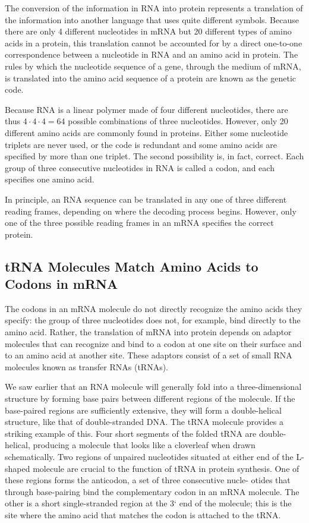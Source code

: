 The conversion of the information in RNA into protein represents a translation
of the information into another language that uses
quite different symbols. Because there are only 4 different nucleotides in
mRNA but 20 different types of amino acids in a protein, this translation
cannot be accounted for by a direct one-to-one correspondence between
a nucleotide in RNA and an amino acid in protein. The rules by which the
nucleotide sequence of a gene, through the medium of mRNA, is translated
into the amino acid sequence of a protein are known as the genetic
code.

Because RNA is a linear polymer made of four different 
nucleotides, there are thus $4 \cdot 4 \cdot 4 = 64$ possible combinations of
three nucleotides. However, only 20 different amino acids are commonly
found in proteins. Either some nucleotide triplets are never used, or
the code is redundant and some amino acids are
specified by more than one triplet. The second possibility is, in fact, correct.
Each group of three consecutive nucleotides in RNA is called a codon,
and each specifies one amino acid.

In principle, an RNA sequence can be translated in any one of three different
reading frames, depending on where the decoding process begins. However,
only one of the three possible reading frames in an mRNA specifies the correct protein.

\subsection{tRNA Molecules Match Amino Acids to Codons in mRNA}

The codons in an mRNA molecule do not directly recognize the amino
acids they specify: the group of three nucleotides does not, for example,
bind directly to the amino acid. Rather, the translation of mRNA into
protein depends on adaptor molecules that can recognize and bind to a
codon at one site on their surface and to an amino acid at another site.
These adaptors consist of a set of small RNA molecules known as transfer RNAs (tRNAs).

We saw earlier that an RNA molecule will generally fold into a three-dimensional
structure by forming base pairs between different regions
of the molecule. If the base-paired regions are sufficiently extensive, they
will form a double-helical structure, like that of double-stranded DNA.
The tRNA molecule provides a striking example of this. Four short segments
of the folded tRNA are double-helical, producing a molecule that
looks like a cloverleaf when drawn schematically.
Two regions of unpaired nucleotides situated at either end of the L-shaped
molecule are crucial to the function of tRNA in protein synthesis. One
of these regions forms the anticodon, a set of three consecutive nucle-
otides that through base-pairing bind the complementary codon in an
mRNA molecule. The other is a short single-stranded region at the 3` end
of the molecule; this is the site where the amino acid that matches the
codon is attached to the tRNA.

